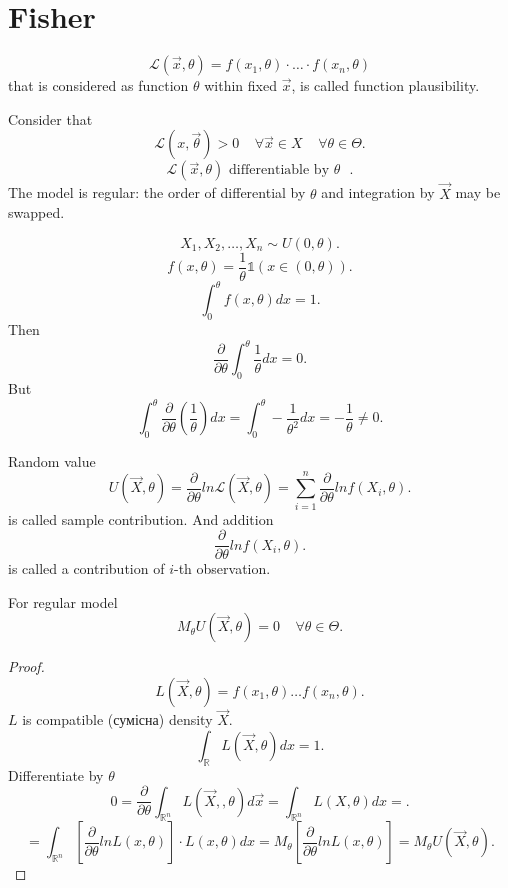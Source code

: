 \section{Fisher}

\begin{definition}
    \[
    \mathcal{L} (\vec{x}, \theta) = f(x_1, \theta) \cdot \ldots \cdot f(x_n, \theta)
    \] that is considered as function $\theta$ within fixed $\vec{x}$, is called function plausibility.
\end{definition}

Consider that
\[
\mathcal{L} (x, \vec{\theta}) > 0 \;\;\;\; \forall \vec{x} \in X \;\;\;\;
\forall \theta \in \Theta
.\] 
\[
\mathcal{L}(\vec{x}, \theta) \text{ differentiable by $\theta$ }
.\]
The model is regular: the order of differential by $\theta$ and integration by $\vec{X}$ may be swapped.

\begin{example}
    \[
    X_1, X_2, \ldots , X_n \sim  U(0, \theta)
    .\] 
    \[
    f(x, \theta) = \frac{1}{\theta} \mathds{1}(x \in (0, \theta))
    .\] 
    \[
    \int_{0}^{\theta} f(x, \theta) dx = 1 
    .\] 
    Then \[
    \frac{\partial}{\partial \theta} \int_{0}^{\theta} \frac{1}{\theta} dx = 0 
    .\] 
    But \[
    \int_{0}^{\theta} \frac{\partial }{\partial \theta} \left( \frac{1}{\theta} \right) dx = \int_{0}^{\theta} - \frac{1}{\theta^2}dx = - \frac{1}{\theta} \not= 0 
    .\] 
\end{example}

\begin{definition}
    Random value 
    \[
    U(\vec{X}, \theta) = \frac{\partial }{\partial \theta} ln \mathcal{L}(\vec{X}, \theta) = \sum_{i=1}^{n} \frac{\partial }{\partial \theta} ln f(X_i, \theta)
    .\] is called sample contribution. And addition
    \[
    \frac{\partial }{\partial \theta} ln f(X_i, \theta)
    .\] is called a contribution of $i$-th observation.
\end{definition}

\begin{corollary}
    For regular model \[
    M_{\theta} U(\vec{X}, \theta) = 0 \;\;\;\; \forall \theta \in \Theta
    .\] 
\end{corollary}
\begin{proof}
    \[
    L(\vec{X}, \theta) = f(x_1, \theta) \ldots f(x_n, \theta)
    .\] 
    $L$ is compatible (сумісна) density $\vec{X}$.
    \[
    \int_{\mathbb{R}}^{} L(\vec{X}, \theta) dx = 1
    .\] 
    Differentiate by $\theta$
    \[
    0 = \frac{\partial }{\partial \theta} \int_{\mathbb{R}^{n}} L(\vec{X},, \theta) d \vec{x} = \int_{\mathbb{R}^{n}}^{} L(X, \theta) dx = 
    .\] 
    \[
    = \int_{\mathbb{R}^{n}}^{} \left[ \frac{\partial }{\partial \theta} ln L(x, \theta)  \right] \cdot L(x, \theta) dx = M_{\theta} \left[ \frac{\partial }{\partial \theta} ln L(x, \theta) \right]  = M_{\theta} U(\vec{X}, \theta)
    .\] 
\end{proof}

